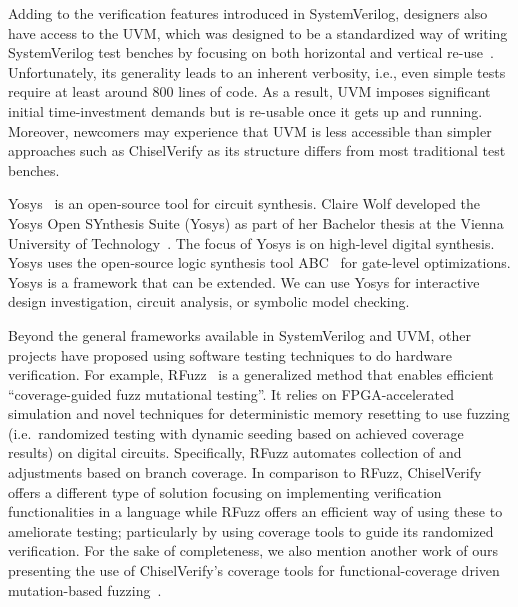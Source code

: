 \documentclass[conference]{IEEEtran}
\begin{document}
Adding to the verification features introduced in SystemVerilog, designers also have 
access to the UVM, which was designed to be a 
standardized way of writing SystemVerilog test benches by focusing on both horizontal and 
vertical re-use~\cite{uvm2015}. Unfortunately, its generality leads to an inherent 
verbosity, i.e., even simple tests require at least around 800 lines of code. As a result, 
UVM imposes significant initial time-investment demands but is re-usable once it gets up and 
running. Moreover, newcomers may experience that UVM is less accessible than simpler approaches 
such as ChiselVerify as its structure differs from most traditional test benches.

Yosys~\cite{Yosys} is an open-source tool for circuit synthesis.
Claire Wolf developed the Yosys Open SYnthesis Suite (Yosys) as part of her
Bachelor thesis at the Vienna University of Technology~\cite{yosys:bachelor}.
The focus of Yosys is on high-level digital synthesis.
Yosys uses the open-source logic synthesis tool ABC~\cite{abc:cav:2010} for gate-level optimizations.
Yosys is a framework that can be extended.
We can use Yosys for interactive design investigation, circuit analysis, or symbolic model checking.


Beyond the general frameworks available in SystemVerilog and UVM, other projects have proposed 
using software testing techniques to do hardware verification. For example, RFuzz~\cite{rfuzz2018} 
is a generalized method that enables efficient ``coverage-guided fuzz mutational testing''. 
It relies on FPGA-accelerated simulation and novel techniques for deterministic memory 
resetting to use fuzzing (i.e.\ randomized testing with dynamic seeding based on achieved 
coverage results) on digital circuits. Specifically, RFuzz automates collection of and adjustments 
based on branch coverage. In comparison to RFuzz, ChiselVerify offers a different type 
of solution focusing on implementing verification functionalities in a language while 
RFuzz offers an efficient way of using these to ameliorate testing; particularly by using coverage 
tools to guide its randomized verification. For the sake of completeness, we also mention another 
work of ours presenting the use of ChiselVerify's coverage tools for functional-coverage driven mutation-based
fuzzing~\cite{verify:fuzzing:2021}.
\end{document}
